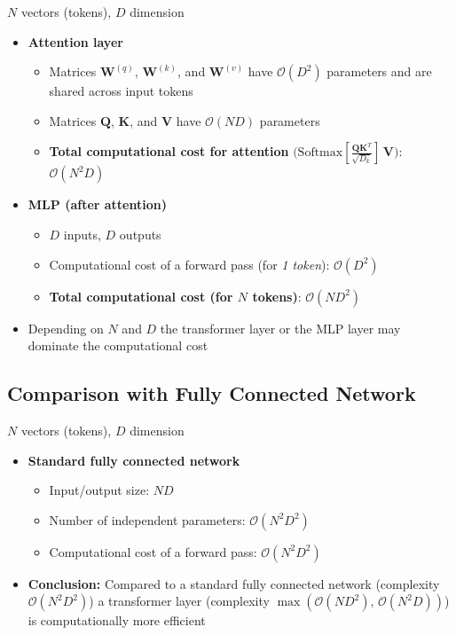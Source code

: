 \documentclass[11pt,a4paper]{article}
\theoremstyle{definition}
\theoremstyle{plain}
\theoremstyle{remark}
\begin{document}
\begin{tcolorbox}[colback=yellow!10!white,colframe=yellow!60!black,title=\textbf{Notation}]
$N$ vectors (tokens), $D$ dimension
\end{tcolorbox}

\begin{itemize}
    \item \textbf{Attention layer}
    \begin{itemize}
        \item Matrices $\mathbf{W}^{(q)}$, $\mathbf{W}^{(k)}$, and $\mathbf{W}^{(v)}$ have $\mathcal{O}(D^2)$ parameters and are shared across input tokens
        \item Matrices $\mathbf{Q}$, $\mathbf{K}$, and $\mathbf{V}$ have $\mathcal{O}(ND)$ parameters
        \item \textbf{Total computational cost for attention} $\big(\text{Softmax}[\frac{\mathbf{Q}\mathbf{K}^T}{\sqrt{D_k}}] \, \mathbf{V}\big)$: $\mathcal{O}(N^2 D)$
    \end{itemize}
    \item \textbf{MLP (after attention)}
    \begin{itemize}
        \item $D$ inputs, $D$ outputs
        \item Computational cost of a forward pass (for \emph{1 token}): $\mathcal{O}(D^2)$
        \item \textbf{Total computational cost (for $N$ tokens)}: $\mathcal{O}(ND^2)$
    \end{itemize}
    \item Depending on $N$ and $D$ the transformer layer or the MLP layer may dominate the computational cost
\end{itemize}

\subsection{Comparison with Fully Connected Network}

\begin{tcolorbox}[colback=yellow!10!white,colframe=yellow!60!black,title=\textbf{Notation}]
$N$ vectors (tokens), $D$ dimension
\end{tcolorbox}

\begin{itemize}
    \item \textbf{Standard fully connected network}
    \begin{itemize}
        \item Input/output size: $ND$
        \item Number of independent parameters: $\mathcal{O}(N^2 D^2)$
        \item Computational cost of a forward pass: $\mathcal{O}(N^2 D^2)$
    \end{itemize}
    \item \textbf{Conclusion:} Compared to a standard fully connected network (complexity $\mathcal{O}(N^2 D^2)$) a transformer layer (complexity $\max(\mathcal{O}(ND^2), \, \mathcal{O}(N^2 D))$) is computationally more efficient
\end{itemize}
\end{document}
